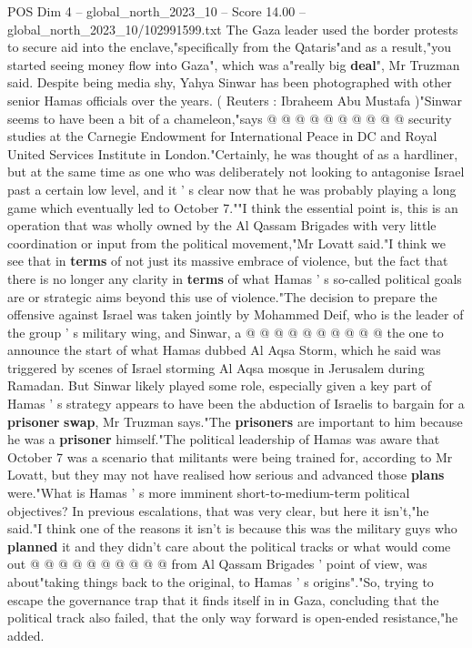 \begin{textsample}{POS Dim 4 – global\_north\_2023\_10 – Score 14.00 – global\_north\_2023\_10/102991599.txt}
The Gaza leader used the border protests to secure aid into the enclave,"specifically from the Qataris"and as a result,"you started seeing money flow into Gaza", which was a"really big \textbf{deal}", Mr Truzman said.
Despite being media shy, Yahya Sinwar has been photographed with other senior Hamas officials over the years. ( Reuters : Ibraheem Abu Mustafa )"Sinwar seems to have been a bit of a chameleon,"says @ @ @ @ @ @ @ @ @ @ security studies at the Carnegie Endowment for International Peace in DC and Royal United Services Institute in London."Certainly, he was thought of as a hardliner, but at the same time as one who was deliberately not looking to antagonise Israel past a certain low level, and it ' s clear now that he was probably playing a long game which eventually led to October 7.""I think the essential point is, this is an operation that was wholly owned by the Al Qassam Brigades with very little coordination or input from the political movement,"Mr Lovatt said."I think we see that in \textbf{terms} of not just its massive embrace of violence, but the fact that there is no longer any clarity in \textbf{terms} of what Hamas ' s so-called political goals are or strategic aims beyond this use of violence."The decision to prepare the offensive against Israel was taken jointly by Mohammed Deif, who is the leader of the group ' s military wing, and Sinwar, a @ @ @ @ @ @ @ @ @ @ the one to announce the start of what Hamas dubbed Al Aqsa Storm, which he said was triggered by scenes of Israel storming Al Aqsa mosque in Jerusalem during Ramadan.
But Sinwar likely played some role, especially given a key part of Hamas ' s strategy appears to have been the abduction of Israelis to bargain for a \textbf{prisoner} \textbf{swap}, Mr Truzman says."The \textbf{prisoners} are important to him because he was a \textbf{prisoner} himself."The political leadership of Hamas was aware that October 7 was a scenario that militants were being trained for, according to Mr Lovatt, but they may not have realised how serious and advanced those \textbf{plans} were."What is Hamas ' s more imminent short-to-medium-term political objectives?
In previous escalations, that was very clear, but here it isn't,"he said."I think one of the reasons it isn't is because this was the military guys who \textbf{planned} it and they didn't care about the political tracks or what would come out @ @ @ @ @ @ @ @ @ @ from Al Qassam Brigades ' point of view, was about"taking things back to the original, to Hamas ' s origins"."So, trying to escape the governance trap that it finds itself in in Gaza, concluding that the political track also failed, that the only way forward is open-ended resistance,"he added.

\end{textsample}
